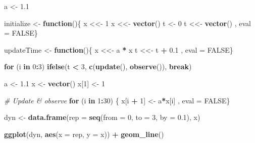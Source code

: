 \documentclass[]{article}
\newenvironment{Shaded}{\begin{snugshade}}{\end{snugshade}}
\newcommand{\KeywordTok}[1]{\textcolor[rgb]{0.13,0.29,0.53}{\textbf{#1}}}
\newcommand{\DataTypeTok}[1]{\textcolor[rgb]{0.13,0.29,0.53}{#1}}
\newcommand{\DecValTok}[1]{\textcolor[rgb]{0.00,0.00,0.81}{#1}}
\newcommand{\FloatTok}[1]{\textcolor[rgb]{0.00,0.00,0.81}{#1}}
\newcommand{\StringTok}[1]{\textcolor[rgb]{0.31,0.60,0.02}{#1}}
\newcommand{\CommentTok}[1]{\textcolor[rgb]{0.56,0.35,0.01}{\textit{#1}}}
\newcommand{\OtherTok}[1]{\textcolor[rgb]{0.56,0.35,0.01}{#1}}
\newcommand{\ControlFlowTok}[1]{\textcolor[rgb]{0.13,0.29,0.53}{\textbf{#1}}}
\newcommand{\OperatorTok}[1]{\textcolor[rgb]{0.81,0.36,0.00}{\textbf{#1}}}
\newcommand{\NormalTok}[1]{#1}
\begin{document}
\begin{Shaded}
\begin{Highlighting}[]
\NormalTok{a <-}\StringTok{ }\FloatTok{1.1}

\NormalTok{initialize <-}\StringTok{ }\ControlFlowTok{function}\NormalTok{()\{}
\NormalTok{  x <<-}\StringTok{ }\DecValTok{1}
\NormalTok{  x <<-}\StringTok{ }\KeywordTok{vector}\NormalTok{()}
\NormalTok{  t <-}\StringTok{ }\DecValTok{0}
\NormalTok{  t <<-}\StringTok{ }\KeywordTok{vector}\NormalTok{()}
\NormalTok{, eval =}\StringTok{ }\OtherTok{FALSE}\NormalTok{\}}

\NormalTok{updateTime <-}\StringTok{ }\ControlFlowTok{function}\NormalTok{()\{}
\NormalTok{  x <<-}\StringTok{ }\NormalTok{a }\OperatorTok{*}\StringTok{ }\NormalTok{x}
\NormalTok{  t <<-}\StringTok{ }\NormalTok{t }\OperatorTok{+}\StringTok{ }\FloatTok{0.1} 
\NormalTok{, eval =}\StringTok{ }\OtherTok{FALSE}\NormalTok{\}}


\ControlFlowTok{for}\NormalTok{ (i }\ControlFlowTok{in} \DecValTok{0}\OperatorTok{:}\DecValTok{3}\NormalTok{) }
  \KeywordTok{ifelse}\NormalTok{(t }\OperatorTok{<}\StringTok{ }\DecValTok{3}\NormalTok{, }\KeywordTok{c}\NormalTok{(}\KeywordTok{update}\NormalTok{(), }\KeywordTok{observe}\NormalTok{()), }\ControlFlowTok{break}\NormalTok{)}




\NormalTok{a <-}\StringTok{ }\FloatTok{1.1}
\NormalTok{x <-}\StringTok{ }\KeywordTok{vector}\NormalTok{()}
\NormalTok{x[}\DecValTok{1}\NormalTok{] <-}\StringTok{ }\DecValTok{1}


\CommentTok{# Update & observe}
\ControlFlowTok{for}\NormalTok{ (i }\ControlFlowTok{in} \DecValTok{1}\OperatorTok{:}\DecValTok{30}\NormalTok{) \{}
\NormalTok{  x[i }\OperatorTok{+}\StringTok{ }\DecValTok{1}\NormalTok{] <-}\StringTok{ }\NormalTok{a}\OperatorTok{*}\NormalTok{x[i]}
\NormalTok{, eval =}\StringTok{ }\OtherTok{FALSE}\NormalTok{\}}

\NormalTok{dyn <-}\StringTok{ }\KeywordTok{data.frame}\NormalTok{(}\DataTypeTok{rep =} \KeywordTok{seq}\NormalTok{(}\DataTypeTok{from =} \DecValTok{0}\NormalTok{, }\DataTypeTok{to =} \DecValTok{3}\NormalTok{, }\DataTypeTok{by =} \FloatTok{0.1}\NormalTok{), x)}

\KeywordTok{ggplot}\NormalTok{(dyn, }\KeywordTok{aes}\NormalTok{(}\DataTypeTok{x =}\NormalTok{ rep, }\DataTypeTok{y =}\NormalTok{ x)) }\OperatorTok{+}
\StringTok{  }\KeywordTok{geom_line}\NormalTok{()}
\end{Highlighting}
\end{Shaded}
\end{document}
